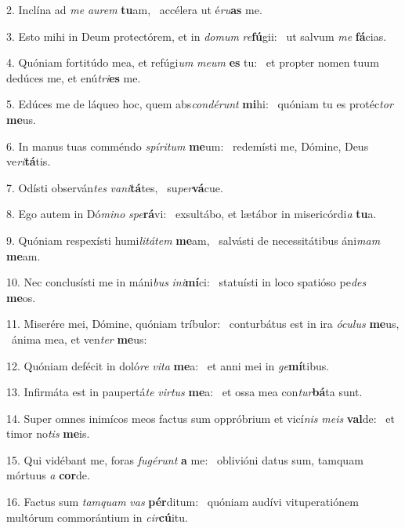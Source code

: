 2. Inclína ad \textit{me} \textit{au}\textit{rem} \textbf{tu}am, \ast\  accélera ut é\textit{ru}\textbf{as} me.\

3. Esto mihi in Deum protectórem, et in \textit{do}\textit{mum} \textit{re}\textbf{fú}gii: \ast\  ut salvum \textit{me} \textbf{fá}cias.\

4. Quóniam fortitúdo mea, et refúgi\textit{um} \textit{me}\textit{um} \textbf{es} tu: \ast\  et propter nomen tuum dedúces me, et enú\textit{tri}\textbf{es} me.\

5. Edúces me de láqueo hoc, quem abs\textit{con}\textit{dé}\textit{runt} \textbf{mi}hi: \ast\  quóniam tu es protéc\textit{tor} \textbf{me}us.\

6. In manus tuas comméndo \textit{spí}\textit{ri}\textit{tum} \textbf{me}um: \ast\  redemísti me, Dómine, Deus ve\textit{ri}\textbf{tá}tis.\

7. Odísti observán\textit{tes} \textit{va}\textit{ni}\textbf{tá}tes, \ast\  su\textit{per}\textbf{vá}cue.\

8. Ego autem in Dó\textit{mi}\textit{no} \textit{spe}\textbf{rá}vi: \ast\  exsultábo, et lætábor in misericórdi\textit{a} \textbf{tu}a.\

9. Quóniam respexísti humi\textit{li}\textit{tá}\textit{tem} \textbf{me}am, \ast\  salvásti de necessitátibus áni\textit{mam} \textbf{me}am.\

10. Nec conclusísti me in máni\textit{bus} \textit{in}\textit{i}\textbf{mí}ci: \ast\  statuísti in loco spatióso pe\textit{des} \textbf{me}os.\

11. Miserére mei, Dómine, quóniam tríbulor: \dag\  conturbátus est in ira \textit{ó}\textit{cu}\textit{lus} \textbf{me}us, \ast\  ánima mea, et ven\textit{ter} \textbf{me}us:\

12. Quóniam defécit in doló\textit{re} \textit{vi}\textit{ta} \textbf{me}a: \ast\  et anni mei in \textit{ge}\textbf{mí}tibus.\

13. Infirmáta est in paupertá\textit{te} \textit{vir}\textit{tus} \textbf{me}a: \ast\  et ossa mea con\textit{tur}\textbf{bá}ta sunt.\

14. Super omnes inimícos meos factus sum oppróbrium et vicí\textit{nis} \textit{me}\textit{is} \textbf{val}de: \ast\  et timor no\textit{tis} \textbf{me}is.\

15. Qui vidébant me, foras \textit{fu}\textit{gé}\textit{runt} \textbf{a} me: \ast\  oblivióni datus sum, tamquam mórtuus \textit{a} \textbf{cor}de.\

16. Factus sum \textit{tam}\textit{quam} \textit{vas} \textbf{pér}ditum: \ast\  quóniam audívi vituperatiónem multórum commorántium in \textit{cir}\textbf{cú}itu.\

